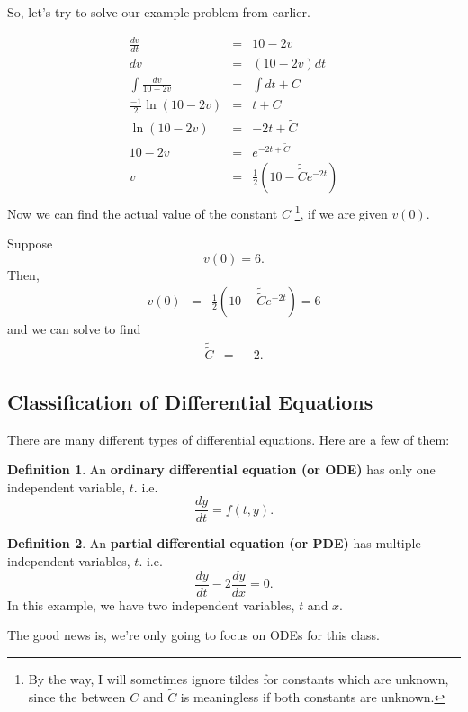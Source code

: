 \documentclass[a5paper]{article}
\theoremstyle{definition}%
\newtheorem*{definition*}{Definition}
\numberwithin{exercise}{section}
\theoremstyle{remark}%
\begin{document}
So, let's try to solve our example problem from earlier. 

\[\begin{array}{rcl}
\frac{dv}{dt} &=& 10-2v\\
dv&=&(10-2v)dt\\
\int \frac{dv}{10-2v} &=& \int dt + C\\
\frac{-1}{2}\ln (10-2v)&=&t+C\\
\ln (10-2v)&=&-2t+\tilde{C}\\
10-2v&=&e^{-2t+\tilde{C}}\\
v&=&\frac{1}{2}(10-\tilde{\tilde{C}}e^{-2t})\\
\end{array}\]
Now we can find the actual value of the constant $C$ \footnote{By the way, I will sometimes ignore tildes for constants which are unknown, since the between $C$ and $\tilde{C}$ is meaningless if both constants are unknown.}, if we are given $v(0)$. 

\noindent Suppose $$v(0)=6.$$ Then, 
\[\begin{array}{rcl}
v(0)&=&\frac{1}{2}(10-\tilde{\tilde{C}}e^{-2t})=6
\end{array}\]
and we can solve to find 
\[\begin{array}{rcl}
\tilde{\tilde{C}}&=&-2.
\end{array}\]

\subsection{Classification of Differential Equations}

There are many different types of differential equations. Here are a few of them:

\begin{highlight}
\begin{definition*}
An \textbf{ordinary differential equation (or ODE)} has only one independent variable, $t$. i.e.
$$\frac{dy}{dt}=f(t,y).$$
\end{definition*}
\end{highlight}

\begin{definition*}
An \textbf{partial differential equation (or PDE)} has multiple independent variables, $t$. i.e.
$$\frac{dy}{dt}-2\frac{dy}{dx}=0.$$
In this example, we have two independent variables, $t$ and $x$.
\end{definition*}

The good news is, we're only going to focus on ODEs for this class. 
\end{document}
